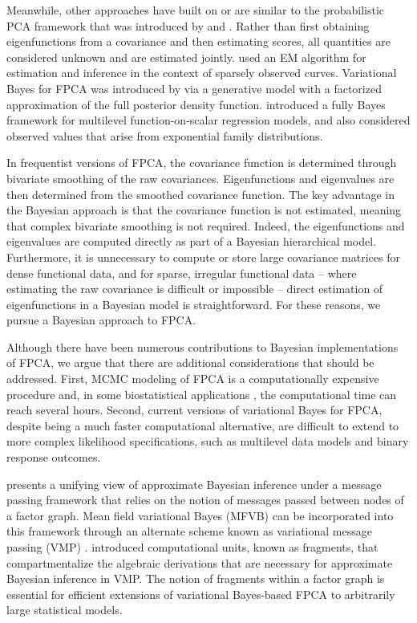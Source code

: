 \documentclass[12pt]{article}
\theoremstyle{plain}
\theoremstyle{definition}
\theoremstyle{remark}
\begin{document}
Meanwhile, other approaches have built on or are similar to the probabilistic PCA framework that was introduced by  and . Rather than first obtaining eigenfunctions from a covariance and then estimating scores, all quantities are considered unknown and are estimated jointly.   used an EM algorithm for estimation and inference in the context of sparsely observed curves. Variational Bayes for FPCA was introduced by  via a generative model with a factorized approximation of the full posterior density function.  introduced a fully Bayes framework for multilevel function-on-scalar
regression models, and also considered observed values that arise from exponential family distributions. 

In frequentist versions of FPCA, the covariance function is determined through bivariate smoothing of the raw
covariances. Eigenfunctions and eigenvalues are then determined from the smoothed covariance function.
The key advantage in the Bayesian approach is that the covariance function is not estimated, meaning that
complex bivariate smoothing is not required. Indeed, the eigenfunctions and eigenvalues are computed directly
as part of a Bayesian hierarchical model. Furthermore, it is unnecessary to compute or store large covariance matrices for dense functional data, and for sparse, irregular functional data -- where estimating the raw covariance is difficult or impossible -- direct estimation of eigenfunctions in a Bayesian model is straightforward. For these reasons, we pursue a Bayesian approach to FPCA.

Although there have been numerous contributions to Bayesian implementations of FPCA, we argue that there are
additional considerations that should be addressed. First, MCMC modeling of FPCA is a computationally expensive
procedure and, in some biostatistical applications \cite{Goldsmith15}, the computational time can reach several
hours. Second, current versions of variational Bayes for FPCA, despite being a much faster computational alternative,
are difficult to extend to more complex likelihood specifications, such as multilevel data models and binary response
outcomes.

 presents a unifying view of approximate Bayesian inference under a message passing framework
that relies on the notion of messages passed between nodes of a factor graph. Mean field variational Bayes (MFVB)
can be incorporated into this framework through an alternate scheme known as variational message passing (VMP)
\cite{winn05}.  introduced computational units, known as fragments, that compartmentalize
the algebraic derivations that are necessary for approximate Bayesian inference in VMP. The notion of fragments
within a factor graph is essential for efficient extensions of variational Bayes-based FPCA to arbitrarily large statistical
models.
\end{document}
